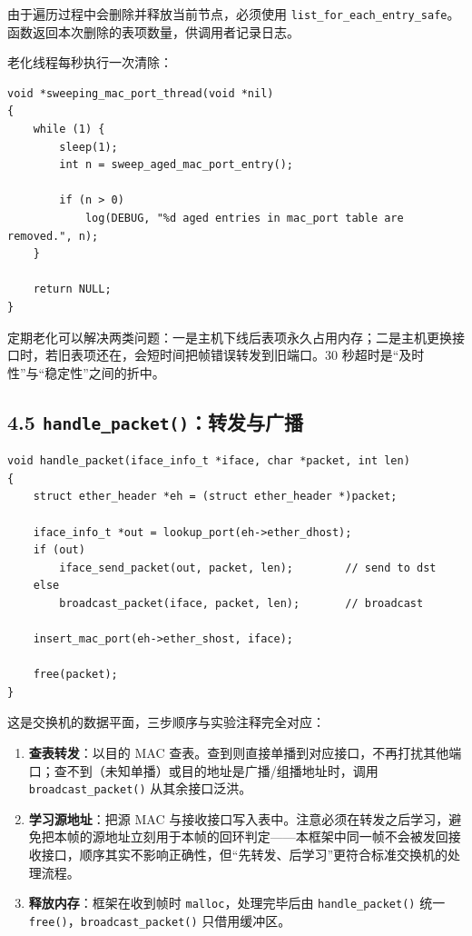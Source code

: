 \documentclass[UTF8,12pt,a4paper,fontset=fandol]{ctexart}
\begin{document}
由于遍历过程中会删除并释放当前节点，必须使用 \texttt{list_for_each_entry_safe}。函数返回本次删除的表项数量，供调用者记录日志。

老化线程每秒执行一次清除：

\begin{verbatim}
void *sweeping_mac_port_thread(void *nil)
{
    while (1) {
        sleep(1);
        int n = sweep_aged_mac_port_entry();

        if (n > 0)
            log(DEBUG, "%d aged entries in mac_port table are removed.", n);
    }

    return NULL;
}
\end{verbatim}

定期老化可以解决两类问题：一是主机下线后表项永久占用内存；二是主机更换接口时，若旧表项还在，会短时间把帧错误转发到旧端口。30 秒超时是“及时性”与“稳定性”之间的折中。

\subsection*{4.5 \texttt{handle_packet()}：转发与广播}

\begin{verbatim}
void handle_packet(iface_info_t *iface, char *packet, int len)
{
    struct ether_header *eh = (struct ether_header *)packet;

    iface_info_t *out = lookup_port(eh->ether_dhost);
    if (out)
        iface_send_packet(out, packet, len);        // send to dst
    else
        broadcast_packet(iface, packet, len);       // broadcast

    insert_mac_port(eh->ether_shost, iface);
    
    free(packet);
}
\end{verbatim}

这是交换机的数据平面，三步顺序与实验注释完全对应：

\begin{enumerate}[leftmargin=1.9em]
  \item \textbf{查表转发}：以目的 MAC 查表。查到则直接单播到对应接口，不再打扰其他端口；查不到（未知单播）或目的地址是广播/组播地址时，调用 \texttt{broadcast_packet()} 从其余接口泛洪。
  \item \textbf{学习源地址}：把源 MAC 与接收接口写入表中。注意必须在转发之后学习，避免把本帧的源地址立刻用于本帧的回环判定——本框架中同一帧不会被发回接收接口，顺序其实不影响正确性，但“先转发、后学习”更符合标准交换机的处理流程。
  \item \textbf{释放内存}：框架在收到帧时 \texttt{malloc}，处理完毕后由 \texttt{handle_packet()} 统一 \texttt{free()}，\texttt{broadcast_packet()} 只借用缓冲区。
\end{enumerate}
\end{document}
